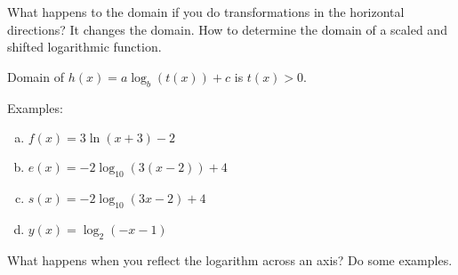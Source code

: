 \documentclass{tufte-handout}
\begin{document}
What happens to the domain if you do transformations in the horizontal directions? It changes the domain.  How to determine the domain of a scaled and shifted logarithmic function.

Domain of $h(x) = a \log_b(t(x)) + c$ is $t(x) > 0$.

Examples:

\begin{multicols}{2}
\begin{enumerate}[(a)]
\item $f(x) = 3 \ln(x+3) -2$
\item $e(x) = -2 \log_{10}(3(x-2)) +4$
\item $s(x) = -2\log_{10}(3x - 2) +4$
\item $y(x) = \log_2(-x-1)$
\end{enumerate}
\end{multicols}

What happens when you reflect the logarithm across an axis? Do some examples.
\end{document}
